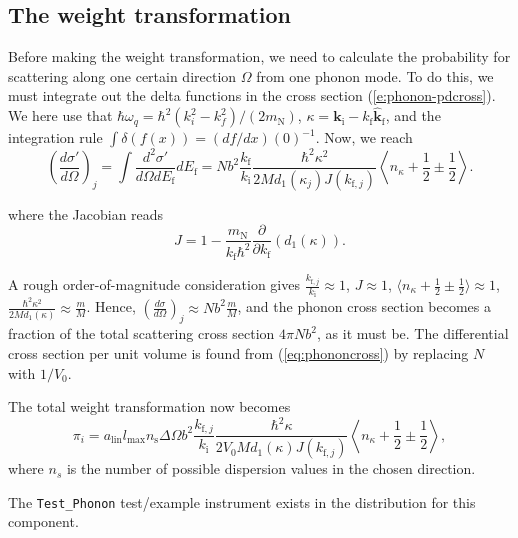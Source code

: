 \subsection{The weight transformation}
Before making the weight transformation, we need to calculate the
probability for scattering along one certain direction $\Omega$
from one phonon mode. To do this, we must integrate out the delta
functions in the cross section (\ref{e:phonon-pdcross}).
We here use that $\hbar \omega_q = \hbar^2 (k_i^2 - k_f^2) / (2 m_\textrm{N})$,
$\kappa = \textbf{k}_\textrm{i} - k_\textrm{f}\hat{\textbf{k}}_\textrm{f}$, and
the integration rule $\int \delta(f(x)) = (df/dx)(0)^{-1}$.
Now, we reach
\begin{equation} \label{eq:phononcross}
\left(\frac{d\sigma'}{d\Omega}\right)_j = \int \frac{d^2\sigma'}{d\Omega dE_\textrm{f}} dE_\textrm{f}
 = N b^2 \frac{k_\textrm{f}}{k_\textrm{i}}
\frac{\hbar^2 \kappa^2}{2M d_1(\kappa_j) J(k_{\textrm{f},j})}
\left\langle n_{\kappa}+\frac12\pm\frac12 \right\rangle .
\end{equation}

where the Jacobian reads
\begin{equation}
J = 1 - \frac{m_\textrm{N}}{k_\textrm{f} \hbar^2}
    \frac{\partial}{\partial k_\textrm{f}} \left( d_1(\kappa) \right) .
\end{equation}

A rough order-of-magnitude consideration gives
$\frac{k_{\textrm{f},j}}{k_\textrm{i}}\approx 1$,
$J \approx 1$,
$\langle n_{\kappa}+\frac12\pm\frac12 \rangle \approx 1$,
$\frac{\hbar^2\kappa^2}{2M d_1(\kappa)}
\approx \frac{m}{M}$.
Hence, $\left(\frac{d\sigma}{d\Omega}\right)_j \approx N b^2 \frac{m}{M}$, and
the phonon cross section becomes a fraction of
the total scattering cross section $4 \pi N b^2$, as it must be.
The differential cross section per unit volume is found from
(\ref{eq:phononcross}) by replacing $N$ with $1/V_0$.

The total weight transformation now becomes
\begin{equation} \label{eq:phonon_mult}
\pi_i = a_\textrm{lin} l_\textrm{max} n_\textrm{s} \Delta \Omega
 b^2 \frac{k_{\textrm{f},j}}{k_\textrm{i}}
 \frac{\hbar^2 \kappa}{2 V_0 M d_1(\kappa) J(k_{\textrm{f},j})}
 \left\langle n_{\kappa}+\frac12 \pm\frac12 \right\rangle ,
\end{equation}
where $n_s$ is the number of possible dispersion values in the chosen direction.

The \verb+Test_Phonon+ test/example instrument exists in the distribution for this component.
